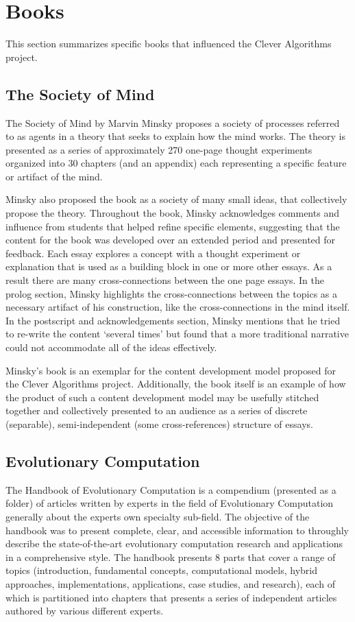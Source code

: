 \documentclass[a4paper, 11pt]{article}
\begin{document}
\section{Books}
\label{sec:books}
This section summarizes specific books that influenced the Clever Algorithms project.

% 
% 
\subsection{The Society of Mind}
The Society of Mind by Marvin Minsky \cite{Minsky1988} proposes a society of processes referred to as agents in a theory that seeks to explain how the mind works. The theory is presented as a series of approximately 270 one-page thought experiments organized into 30 chapters (and an appendix) each representing a specific feature or artifact of the mind. 

Minsky also proposed the book as a society of many small ideas, that collectively propose the theory. Throughout the book, Minsky acknowledges comments and influence from students that helped refine specific elements, suggesting that the content for the book was developed over an extended period and presented for feedback. Each essay explores a concept with a thought experiment or explanation that is used as a building block in one or more other essays. As a result there are many cross-connections between the one page essays. In the prolog section, Minsky highlights the cross-connections between the topics as a necessary artifact of his construction, like the cross-connections in the mind itself. In the postscript and acknowledgements section, Minsky mentions that he tried to re-write the content `several times' but found that a more traditional narrative could not accommodate all of the ideas effectively. 

Minsky's book is an exemplar for the content development model proposed for the Clever Algorithms project. Additionally, the book itself is an example of how the product of such a content development model may be usefully stitched together and collectively presented to an audience as a series of discrete (separable), semi-independent (some cross-references) structure of essays. 

% 
% 
\subsection{Evolutionary Computation}
\label{subsec:ec}
The Handbook of Evolutionary Computation \cite{Baeck1997} is a compendium (presented as a folder) of articles written by experts in the field of Evolutionary Computation generally about the experts own specialty sub-field. The objective of the handbook was to present complete, clear, and accessible information to throughly describe the state-of-the-art evolutionary computation research and applications in a comprehensive style. The handbook presents 8 parts that cover a range of topics (introduction, fundamental concepts, computational models, hybrid approaches, implementations, applications, case studies, and research), each of which is partitioned into chapters that presents a series of independent articles authored by various different experts.
\end{document}
